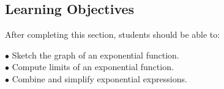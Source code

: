 \documentclass{ximera}
\begin{document}
%
%
%
%		
%		
%		
%		
%		

\subsection{Learning Objectives}
After completing this section, students should be able to:
\vspace{.05in}

\noindent$\bullet$ Sketch the graph of an exponential function.
\\$\bullet$ Compute limits of an exponential function.
\\$\bullet$ Combine and simplify exponential expressions.
\end{document}

